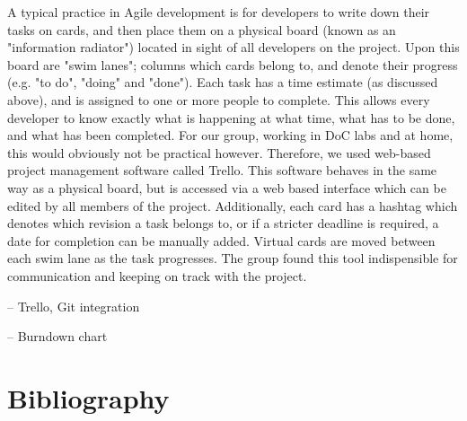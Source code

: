 \documentclass[a4wide, 11pt]{article}
\begin{document}
A typical practice in Agile development is for developers to write down their
tasks on cards, and then place them on a physical board (known as an
"information radiator") located in sight of all developers on the project. 
Upon this board are "swim lanes"; columns which cards belong to, and denote 
their progress (e.g. "to do", "doing" and "done"). Each task has a time 
estimate (as discussed above), and is assigned to one or more people to complete.
This allows every developer to know exactly what is happening at what time,
what has to be done, and what has been completed. For our group, working in 
DoC labs and at home, this would obviously not be practical however. Therefore,
we used web-based project management software called Trello. This software
behaves in the same way as a physical board, but is accessed via a web based
interface which can be edited by all members of the project. Additionally, each
card has a hashtag which denotes which revision a task belongs to, or if a
stricter deadline is required, a date for completion can be manually added.
Virtual cards are moved between each swim lane as the task progresses. The
group found this tool indispensible for communication and keeping on track with
the project.



-- Trello, Git integration

-- Burndown chart


\section{Bibliography}
\end{document}
